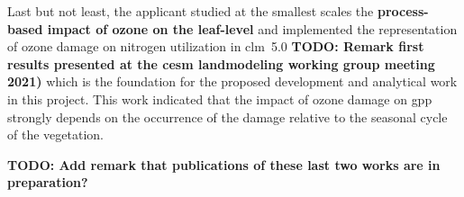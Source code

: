 Last but not least, the applicant studied at the smallest scales the \textbf{process-based impact of ozone on the leaf-level} and implemented the representation of ozone damage on nitrogen utilization in \gls{clm}~5.0 \textbf{TODO: Remark first results presented at the \gls{cesm} landmodeling working group meeting 2021)} which is the foundation for the proposed development and analytical work in this project. This work indicated that the impact of ozone damage on \gls{gpp} strongly depends on the occurrence of the damage relative to the seasonal cycle of the vegetation.

\textbf{TODO: Add remark that publications of these last two works are in preparation?}
